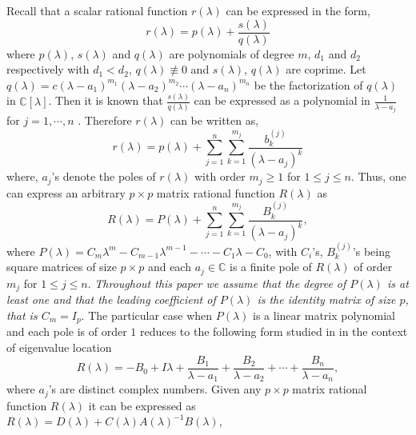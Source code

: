 \documentclass[12pt, reqno]{amsart}
\theoremstyle{definition}
\theoremstyle{remark}
\numberwithin{equation}{section}
\begin{document}
Recall that a scalar rational function $r(\lambda)$ can 
be expressed in the form, 
\begin{equation}\label{Eqn-scalar rational function}
\displaystyle r(\lambda) = p(\lambda) +  \frac{s(\lambda)}{q(\lambda)} 	
\end{equation}
where $p(\lambda)$, $s(\lambda)$ and $q(\lambda)$ are polynomials of degree $m$, $d_1$ 
and $d_2$ respectively with $d_1<d_2$, $q(\lambda) \not \equiv 0$ and $s(\lambda)$, $q(\lambda)$ 
are coprime. Let $q(\lambda) = c(\lambda-a_1)^{m_1} (\lambda-a_2)^{m_2} \cdots (\lambda-a_n)^{m_n}$ 
be the factorization of $q(\lambda)$ in $\mathbb{C}[\lambda]$. Then it is known that 
$\displaystyle \frac{s(\lambda)}{q(\lambda)}$ can be expressed as a polynomial in 
$\displaystyle \frac{1}{\lambda-a_j}$ for $j =1, \cdots, n$ \cite{Ponnusamy}. Therefore 
$r(\lambda)$ can be written as,
\begin{equation}\label{Eqn-scalar rational function-general form}
r(\lambda) = p(\lambda) + \displaystyle \sum_{j=1}^{n} \sum_{k=1}^{m_j} 
\frac{b_k^{(j)}}{(\lambda-a_j)^k}
\end{equation}
where, $a_j$'s denote the poles of $r(\lambda)$ with order $m_j \geq 1$ for 
$1 \leq j \leq n$. Thus, one can express an arbitrary $p \times p$ matrix rational function $R(\lambda)$ as 
\begin{equation}\label{Eqn- rational matrix}
R(\lambda) = P(\lambda) +\displaystyle \sum_{j=1}^{n} \sum_{k=1}^{m_j} 
\frac{B_k^{(j)}}{(\lambda-a_j)^k},
\end{equation}
where $P(\lambda)=C_m\lambda^m- C_{m-1}\lambda^{m-1} - \cdots -C_1 \lambda - C_0$, with 
$C_i$'s, $B_k^{(j)}$'s being square matrices of size $p\times p$ and each $a_j \in \mathbb{C}$ 
is a finite pole of $R(\lambda)$ of order $m_j$ for $1 \leq j \leq n$. \emph{Throughout 
this paper we assume that the degree of $P(\lambda)$ is at least one and that the leading coefficient of $P(\lambda)$ is the identity matrix of size $p$, that is $C_m=I_p$}. 
The particular case when $P(\lambda)$ is a linear matrix polynomial 
and each pole is of order $1$ reduces to the following form studied in \cite{Pallavi} in the context of eigenvalue location  
\begin{equation}\label{Eqn-rational matrix-linear}
R(\lambda) = \displaystyle -B_0 +I\lambda +\frac{B_1}{\lambda-a_1}+ \frac{B_2}{\lambda-a_2} + 
\cdots + \frac{B_n} {\lambda-a_n},
\end{equation} 
where $a_j$'s are distinct complex numbers. Given any $p \times p$ matrix rational 
function $R(\lambda)$ it can be expressed as $R(\lambda) = D(\lambda)+C(\lambda)A(\lambda)^{-1}B(\lambda)$, 
\end{document}
